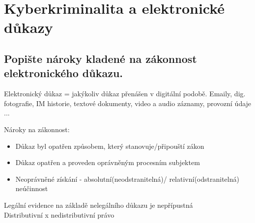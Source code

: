 \section{Kyberkriminalita a elektronické důkazy}

\subsection{Popište nároky kladené na zákonnost elektronického důkazu.}
Elektronický důkaz = jakýkoliv důkaz přenášen v digitální podobě. Emaily, dig. fotografie, IM historie, textové dokumenty, video a audio záznamy, provozní údaje ...

Nároky na zákonnost:\begin{itemize}
    \item Důkaz byl opatřen způsobem, který stanovuje/připouští zákon
    \item Důkaz opatřen a proveden oprávněným procesním subjektem
    \item Neoprávněné získání - absolutní(neodstranitelná)/ relativní(odstranitelná) neúčinnost
\end{itemize}
Legální evidence na základě nelegálního důkazu je nepřípustná\\
Distributivní x nedistributivní právo

